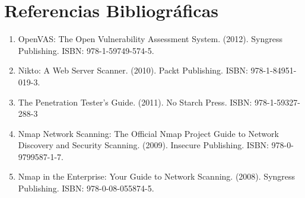 \documentclass[12pt,a4paper]{article}
\begin{document}
\section*{Referencias Bibliográficas}
\begin{enumerate}
    \item OpenVAS: The Open Vulnerability Assessment System. (2012). Syngress Publishing. ISBN: 978-1-59749-574-5.
    \item Nikto: A Web Server Scanner. (2010). Packt Publishing. ISBN: 978-1-84951-019-3.
    \item The Penetration Tester's Guide. (2011). No Starch Press. ISBN: 978-1-59327-288-3
    \item Nmap Network Scanning: The Official Nmap Project Guide to Network Discovery and Security Scanning. (2009). Insecure Publishing. ISBN: 978-0-9799587-1-7.
    \item Nmap in the Enterprise: Your Guide to Network Scanning. (2008). Syngress Publishing. ISBN: 978-0-08-055874-5.
\end{enumerate}
\end{document}
